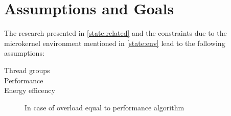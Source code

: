 \section{Assumptions and Goals}
\label{design:assump}

The research presented in \ref{state:related} and the constraints due to
the microkernel environment mentioned in \ref{state:env} lead to the following
assumptions:

\begin{description}
  \item[Thread groups]
  \item[Performance]
  \item[Energy efficency] In case of overload equal to performance algorithm
\end{description}


